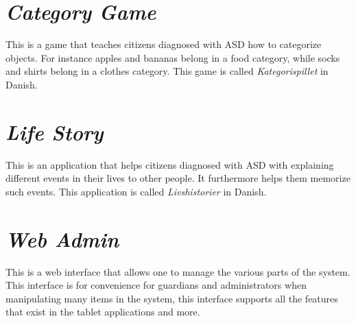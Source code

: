 \section{\emph{Category Game}}
\label{sec:app_category_game}
This is a game that teaches citizens diagnosed with ASD how to categorize objects. For instance apples and bananas belong in a food category, while socks and shirts belong in a clothes category. This game is called \emph{Kategorispillet} in Danish.

\section{\emph{Life Story}}
\label{sec:app_life_story}
This is an application that helps citizens diagnosed with ASD with explaining different events in their lives to other people. It furthermore helps them memorize such events. This application is called \emph{Livshistorier} in Danish.

\section{\emph{Web Admin}}
\label{sec:app_web_admin}
This is a web interface that allows one to manage the various parts of the \giraf system. This interface is for convenience for guardians and administrators when manipulating many items in the system, this interface supports all the features that exist in the tablet applications and more.